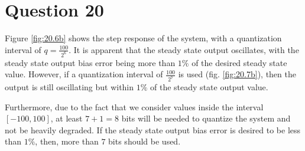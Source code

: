 \section{Question 20}

Figure \ref{fig:20.6b} shows the step response of the system, with a quantization
interval of $q=\frac{100}{2^6}$. It is apparent that the steady state output
oscillates, with the steady state output bias error being more than $1\%$ of
the desired steady state value. However, if a quantization interval of
$\frac{100}{2^7}$ is used (fig. \ref{fig:20.7b}), then the output is still
oscillating but within $1\%$ of the steady state output value.

Furthermore, due to the fact that we consider values inside the interval
$[-100, 100]$, at least $7+1 = 8$ bits will be needed to quantize the system and
not be heavily degraded. If the steady state output bias error is desired to be
less than $1\%$, then, more than $7$ bits should be used.


\noindent{}
